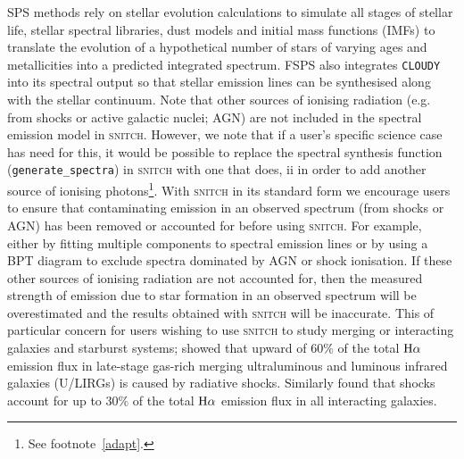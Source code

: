 \documentclass[useAMS,usenatbib]{mn2e}
\def\referee		{\color{refer}}
\def\refereeii		{\color{refer2}}
\begin{document}
SPS methods rely on stellar evolution calculations to simulate all stages of stellar life, stellar spectral libraries, dust models and initial mass functions (IMFs) to translate the evolution of a hypothetical number of stars of varying ages and metallicities into a predicted integrated spectrum. FSPS also integrates \texttt{CLOUDY} \citep{ferland13} into its spectral output so that stellar emission lines can be synthesised along with the stellar continuum. {\referee Note that other sources of ionising radiation (e.g. {\refereeii from shocks or} active galactic nuclei; AGN) are not included in the spectral emission model in \textsc{snitch}. However, we note that if a user's specific science case has need for this, it would be possible to replace the spectral synthesis function (\texttt{generate\_spectra}) in \textsc{snitch} with one that does, {\referee ii in order to add another source of ionising photons}\footnote{See footnote~\ref{adapt}.}. With \textsc{snitch} in its standard form we encourage users to ensure that contaminating emission in an observed spectrum {\refereeii (from shocks or AGN)} has been removed or accounted for before using \textsc{snitch}. {\refereeii For example, either by fitting multiple components to spectral emission lines or by using a BPT diagram to exclude spectra dominated by AGN or shock ionisation. If these other sources of ionising radiation} are not accounted for, then the measured strength of emission due to star formation in an observed spectrum will be overestimated and the results obtained with \textsc{snitch} will be inaccurate.} {\refereeii This of particular concern for users wishing to use \textsc{snitch} to study merging or interacting galaxies and starburst systems; \cite{rich14} showed that upward of $60\%$ of the total $\rm{H}\alpha$ emission flux in late-stage gas-rich merging ultraluminous and luminous infrared galaxies (U/LIRGs) is caused by radiative shocks. Similarly \cite{rich15} found that shocks account for up to $30\%$ of the total $\rm{H}\alpha$ emission flux in all interacting galaxies.}


\end{document}
